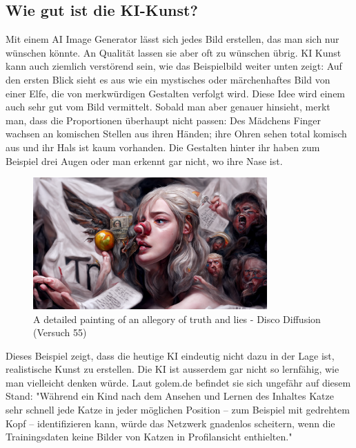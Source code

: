 \documentclass{article}
\begin{document}
    \subsection{Wie gut ist die KI-Kunst?}  
    Mit einem AI Image Generator lässt sich jedes Bild erstellen, das man sich nur wünschen könnte. 
        An Qualität lassen sie aber oft zu wünschen übrig. 
        KI Kunst kann auch ziemlich verstörend sein, wie das Beispielbild weiter unten zeigt: Auf den ersten Blick sieht es aus wie ein mystisches oder märchenhaftes Bild von einer Elfe, die von merkwürdigen Gestalten verfolgt wird. Diese Idee wird einem auch sehr gut vom Bild vermittelt. Sobald man aber genauer hinsieht, merkt man, dass die Proportionen überhaupt nicht passen: Des Mädchens Finger wachsen an komischen Stellen aus ihren Händen; ihre Ohren sehen total komisch aus und ihr Hals ist kaum vorhanden. Die Gestalten hinter ihr haben zum Beispiel drei Augen oder man erkennt gar nicht, wo ihre Nase ist. 
        \begin{figure}[ht]
        \centering        
        \includegraphics[width=0.8\textwidth]{ki-bild.png} 
        \caption{A detailed painting of an allegory of truth and lies - Disco Diffusion (Versuch 55)}
        \label{fig:ki-bild}
        \end{figure}
        Dieses Beispiel zeigt, dass die heutige KI eindeutig nicht dazu in der Lage ist, realistische Kunst zu erstellen.
        Die KI ist ausserdem gar nicht so lernfähig, wie man vielleicht denken würde. Laut golem.de befindet sie sich ungefähr auf diesem Stand: "Während ein Kind nach dem Ansehen und Lernen des Inhaltes Katze sehr schnell jede Katze in jeder möglichen Position – zum Beispiel mit gedrehtem Kopf – identifizieren kann, würde das Netzwerk gnadenlos scheitern, wenn die Trainingsdaten keine Bilder von Katzen in Profilansicht enthielten." 

\newpage
\end{document}
